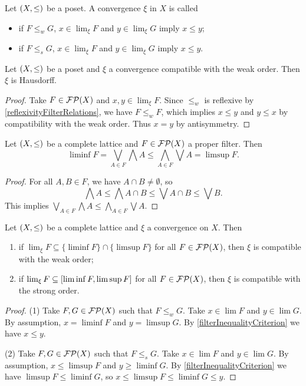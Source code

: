 \begin{definition}
Let $\sSet{X,\leq}$ be a poset. A convergence $\xi$ in $X$ is called
\begin{itemize}
\item {} if $F \leq_w G$, $x\in\lim_\xi F$ and $y\in \lim_\xi G$ imply $x\leq y$;
\item {} if $F \leq_s G$, $x\in\lim_\xi F$ and $y\in \lim_\xi G$ imply $x\leq y$.
\end{itemize}
\end{definition}

\begin{lemma} \label{compatibleWeakOrderHausdorff}
Let $\sSet{X,\leq}$ be a poset and $\xi$ a convergence compatible with the weak order. Then $\xi$ is Hausdorff.
\end{lemma}
\begin{proof}
Take $F\in\operatorname{\mathcal{FP}}(X)$ and $x,y\in \lim_\xi F$. Since $\leq_w$ is reflexive by \ref{reflexivityFilterRelations}, we have $F\leq_w F$, which implies $x\leq y$ and $y\leq x$ by compatibility with the weak order. Thus $x=y$ by antisymmetry.
\end{proof}

\begin{lemma} \label{limsupLiminfInequality}
Let $\sSet{X,\leq}$ be a complete lattice and $F\in \operatorname{\mathcal{FP}}(X)$ a proper filter. Then
\[ \liminf F = \bigvee_{A\in F}\bigwedge A \leq \bigwedge_{A\in F}\bigvee A = \limsup F. \]
\end{lemma}
\begin{proof}
For all $A,B\in F$, we have $A\cap B\neq \emptyset$, so
\[ \bigwedge A \leq \bigwedge A\cap B \leq \bigvee A\cap B \leq \bigvee B. \]
This implies $\bigvee_{A\in F}\bigwedge A \leq \bigwedge_{A\in F}\bigvee A$.
\end{proof}

\begin{lemma} \label{completePosetConvergenceCompatibleWithWeakOrder}
Let $\sSet{X,\leq}$ be a complete lattice and $\xi$ a convergence on $X$. Then
\begin{enumerate}
\item if $\lim_\xi F\subseteq \{\liminf F\}\cap\{\limsup F\}$ for all $F\in\operatorname{\mathcal{FP}}(X)$, then $\xi$ is compatible with the weak order;
\item if $\lim_\xi F\subseteq \interval{\liminf F, \limsup F}$ for all $F\in\operatorname{\mathcal{FP}}(X)$, then $\xi$ is compatible with the strong order.
\end{enumerate}
\end{lemma}
\begin{proof}
(1) Take $F,G\in \operatorname{\mathcal{FP}}(X)$ such that $F\leq_w G$. Take $x\in \lim F$ and $y\in \lim G$. By assumption, $x = \liminf F$ and $y = \limsup G$. By \ref{filterInequalityCriterion} we have $x\leq y$.

(2) Take $F,G\in \operatorname{\mathcal{FP}}(X)$ such that $F\leq_s G$. Take $x\in \lim F$ and $y\in \lim G$. By assumption, $x \leq \limsup F$ and $y \geq \liminf G$. By \ref{filterInequalityCriterion} we have $\limsup F\leq \liminf G$, so $x\leq \limsup F\leq \liminf G \leq y$.
\end{proof}


